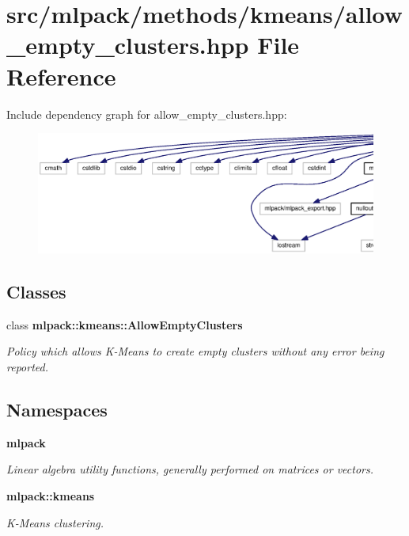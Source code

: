 \section{src/mlpack/methods/kmeans/allow\+\_\+empty\+\_\+clusters.hpp File Reference}
\label{allow__empty__clusters_8hpp}
Include dependency graph for allow\+\_\+empty\+\_\+clusters.\+hpp\+:
\nopagebreak
\begin{figure}[H]
\begin{center}
\leavevmode
\includegraphics[width=350pt]{allow__empty__clusters_8hpp__incl}
\end{center}
\end{figure}
\subsection*{Classes}
\begin{DoxyCompactItemize}
\item 
class {\bf mlpack\+::kmeans\+::\+Allow\+Empty\+Clusters}
\begin{DoxyCompactList}\small\item\em Policy which allows K-\/\+Means to create empty clusters without any error being reported. \end{DoxyCompactList}\end{DoxyCompactItemize}
\subsection*{Namespaces}
\begin{DoxyCompactItemize}
\item 
 {\bf mlpack}
\begin{DoxyCompactList}\small\item\em Linear algebra utility functions, generally performed on matrices or vectors. \end{DoxyCompactList}\item 
 {\bf mlpack\+::kmeans}
\begin{DoxyCompactList}\small\item\em K-\/\+Means clustering. \end{DoxyCompactList}\end{DoxyCompactItemize}


